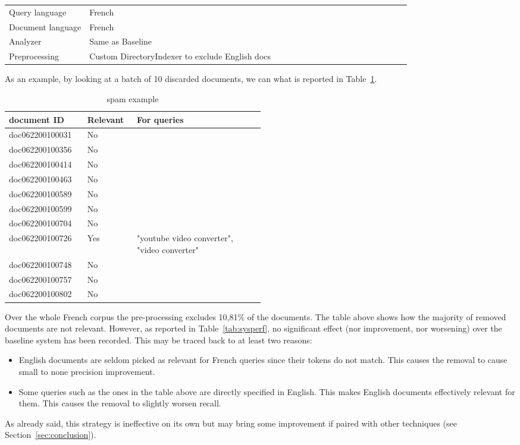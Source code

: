 \begin{table}[h!]
    \centering
    \begin{tabular}{l p{0.8\linewidth}}
    Query language & French\\
    Document language & French\\
    Analyzer & Same as Baseline\\
    Preprocessing & Custom DirectoryIndexer to exclude English docs
    \end{tabular}
\end{table}
As an example, by looking at a batch of 10 discarded documents, we can what is reported in Table~\ref{tab:spamextab}.
\begin{table}[tb]
    \caption{spam example}
  \label{tab:spamextab}
  \centering
  \begin{tabular}{|l|l|p{0.5\linewidth}|}
    \toprule
    document ID&Relevant&For queries\\
    \midrule
    doc062200100031&No&\\
    doc062200100356&No&\\
    doc062200100414&No&\\
    doc062200100463&No&\\
    doc062200100589&No&\\
    doc062200100599&No&\\
    doc062200100704&No&\\
    doc062200100726&Yes&"youtube video converter", "video converter" \\
    doc062200100748&No&\\
    doc062200100757&No&\\
    doc062200100802&No&\\
  \bottomrule
\end{tabular}
\end{table}
\par Over the whole French corpus the pre-processing excludes 10,81\% of the documents. The table above shows how the majority of removed documents are not relevant. However, as reported in Table~\ref{tab:sysperf}, no significant effect (nor improvement, nor worsening) over the baseline system has been recorded. This may be traced back to at least two reasons:
\begin{itemize}
    \item English documents are seldom picked as relevant for French queries since their tokens do not match. This causes the removal to cause small to none precision improvement.
    \item Some queries such as the ones in the table above are directly specified in English. This makes English documents effectively relevant for them. This causes the removal to slightly worsen recall.
\end{itemize}
As already said, this strategy is ineffective on its own but may bring some improvement if paired with other techniques (see Section~\ref{sec:conclusion}).
